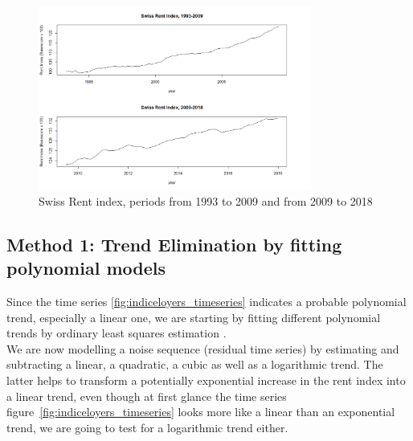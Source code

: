 \documentclass[11pt,a4paper]{article}
\begin{document}
\begin{figure}[!htb]
\centering
\includegraphics[angle=0,
width=0.8\textwidth]{indiceloyers_test_train}
\caption{Swiss Rent index, periods from 1993 to 2009 and from 2009 to 2018}\label{fig: indiceloyers_test_train}
\end{figure}

\subsection{Method 1: Trend Elimination by fitting polynomial models}
Since the time series \ref{fig:indiceloyers_timeseries} indicates a probable polynomial trend, especially a linear one, we are starting by fitting different polynomial trends by ordinary least squares estimation \cite[p.~11]{htf09}.\\

We are now modelling a noise sequence (residual time series) by estimating and subtracting a linear, a quadratic, a cubic as well as a logarithmic trend. The latter  helps to transform a potentially exponential increase in the rent index into a linear trend, even though at first glance the time series figure~\ref{fig:indiceloyers_timeseries} looks more like a linear than an exponential trend, we are going to test for a logarithmic trend either.\\
\end{document}
